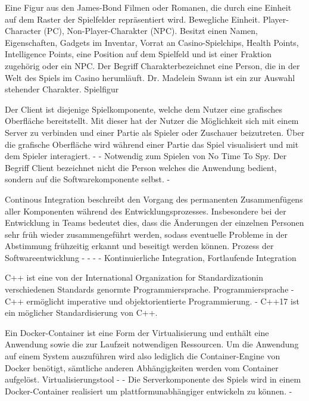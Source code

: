 {Eine Figur aus den James-Bond Filmen oder Romanen, die durch eine Einheit auf dem Raster der Spielfelder repräsentiert wird.}
{Bewegliche Einheit.}
{Player-Character (PC), Non-Player-Charakter (NPC).}
{Besitzt einen Namen, Eigenschaften, Gadgets im Inventar, Vorrat an Casino-Spielchips, Health Points, Intelligence Points, eine Position auf dem Spielfeld und ist einer Fraktion zugehörig oder ein NPC.}
{Der Begriff \glqq Charakter\grqq bezeichnet eine Person, die in der Welt des Spiels im Casino herumläuft.}
{Dr. Madelein Swann ist ein zur Auswahl stehender Charakter.}
{Spielfigur}

{Der Client ist diejenige Spielkomponente, welche dem Nutzer eine grafisches Oberfläche bereitstellt. Mit dieser hat der Nutzer die Möglichkeit sich mit einem Server zu verbinden und einer Partie als Spieler oder Zuschauer beizutreten. Über die grafische Oberfläche wird während einer Partie das Spiel visualisiert und mit dem Spieler interagiert. }
{-}
{-}
{Notwendig zum Spielen von \glqq No Time To Spy\grqq.}
{Der Begriff Client bezeichnet nicht die Person welches die Anwendung bedient, sondern auf die Softwarekomponente selbst.}
{-}

{Continous Integration beschreibt den Vorgang des permanenten Zusammenfügens aller Komponenten während des Entwicklungsprozesses. Insbesondere bei der Entwicklung in Teams bedeutet dies, dass die Änderungen der einzelnen Personen sehr früh wieder zusammengeführt werden, sodass eventuelle Probleme in der Abstimmung frühzeitig erkannt und beseitigt werden können.}
{Prozess der Softwareentwicklung}
{-}
{-}
{-}
{-}
{Kontinuierliche Integration, Fortlaufende Integration}

{C++ ist eine von der \glqq International Organization for Standardization\grqq in verschiedenen Standards genormte Programmiersprache.}
{Programmiersprache}
{-}
{C++ ermöglicht imperative und objektorientierte Programmierung.}
{-}
{C++17 ist ein möglicher Standardisierung von C++.}

{Ein Docker-Container ist eine Form der Virtualisierung und enthält eine Anwendung sowie die zur Laufzeit notwendigen Ressourcen. Um die Anwendung auf einem System auszuführen wird also lediglich die Container-Engine von Docker benötigt, sämtliche anderen Abhängigkeiten werden vom Container aufgelöst.}
{Virtualisierungstool}
{-}
{-}
{Die Serverkomponente des Spiels wird in einem Docker-Container realisiert um plattformunabhängiger entwickeln zu können.}
{-}

